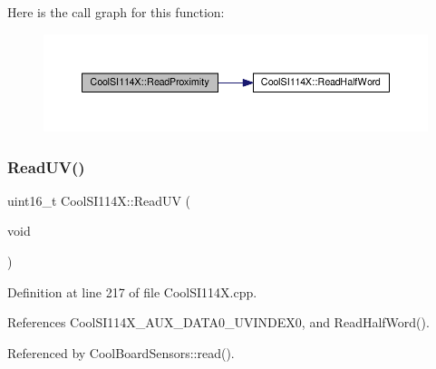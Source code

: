 Here is the call graph for this function\+:\nopagebreak
\begin{figure}[H]
\begin{center}
\leavevmode
\includegraphics[width=350pt]{dd/d67/class_cool_s_i114_x_a194fede1105508c7803dbb567cbdcc67_cgraph}
\end{center}
\end{figure}
\mbox{\label{class_cool_s_i114_x_a14ced664d74e93438440b0274109c111}} 
\subsubsection{\texorpdfstring{Read\+U\+V()}{ReadUV()}}
{\footnotesize\ttfamily uint16\+\_\+t Cool\+S\+I114\+X\+::\+Read\+UV (\begin{DoxyParamCaption}\item[{void}]{ }\end{DoxyParamCaption})}



Definition at line 217 of file Cool\+S\+I114\+X.\+cpp.



References Cool\+S\+I114\+X\+\_\+\+A\+U\+X\+\_\+\+D\+A\+T\+A0\+\_\+\+U\+V\+I\+N\+D\+E\+X0, and Read\+Half\+Word().



Referenced by Cool\+Board\+Sensors\+::read().

